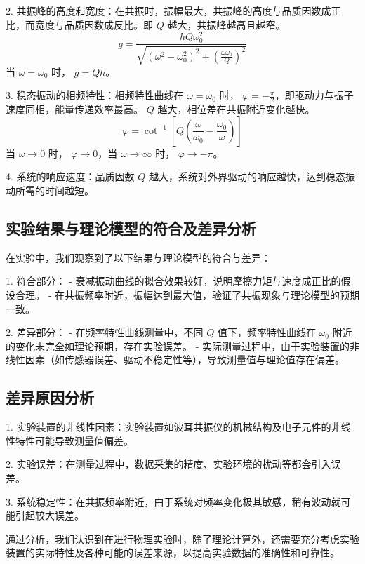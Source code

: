 \documentclass[UTF8]{ctexart}
\begin{document}
2. 共振峰的高度和宽度：在共振时，振幅最大，共振峰的高度与品质因数成正比，而宽度与品质因数成反比。即 \( Q \) 越大，共振峰越高且越窄。
   \[
   g = \frac{hQ \omega_0^2}{\sqrt{(\omega^2 - \omega_0^2)^2 + \left(\frac{\omega \omega_0}{Q}\right)^2}}
   \]
   当 \( \omega = \omega_0 \) 时， \( g = Qh \)。

3. 稳态振动的相频特性：相频特性曲线在 \( \omega = \omega_0 \) 时， \( \varphi = -\frac{\pi}{2} \)，即驱动力与振子速度同相，能量传递效率最高。 \( Q \) 越大，相位差在共振附近变化越快。
   \[
   \varphi = \cot^{-1} \left[Q \left( \frac{\omega}{\omega_0} - \frac{\omega_0}{\omega} \right)\right]
   \]
   当 \( \omega \rightarrow 0 \) 时， \( \varphi \rightarrow 0 \)，当 \( \omega \rightarrow \infty \) 时， \( \varphi \rightarrow -\pi \)。

4. 系统的响应速度：品质因数 \( Q \) 越大，系统对外界驱动的响应越快，达到稳态振动所需的时间越短。

\subsection{实验结果与理论模型的符合及差异分析}
在实验中，我们观察到了以下结果与理论模型的符合与差异：

1. 符合部分：
   - 衰减振动曲线的拟合效果较好，说明摩擦力矩与速度成正比的假设合理。
   - 在共振频率附近，振幅达到最大值，验证了共振现象与理论模型的预期一致。

2. 差异部分：
   - 在频率特性曲线测量中，不同 \( Q \) 值下，频率特性曲线在 \( \omega_0 \) 附近的变化未完全如理论预期，存在实验误差。
   - 实际测量过程中，由于实验装置的非线性因素（如传感器误差、驱动不稳定性等），导致测量值与理论值存在偏差。

\subsection{差异原因分析}
1. 实验装置的非线性因素：实验装置如波耳共振仪的机械结构及电子元件的非线性特性可能导致测量值偏差。

2. 实验误差：在测量过程中，数据采集的精度、实验环境的扰动等都会引入误差。

3. 系统稳定性：在共振频率附近，由于系统对频率变化极其敏感，稍有波动就可能引起较大误差。

通过分析，我们认识到在进行物理实验时，除了理论计算外，还需要充分考虑实验装置的实际特性及各种可能的误差来源，以提高实验数据的准确性和可靠性。



\end{document}

